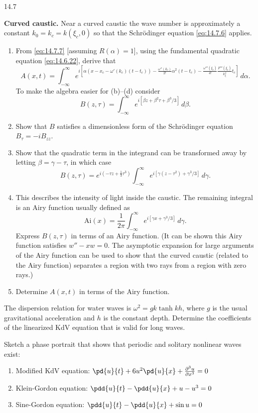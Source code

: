 \begin{exercises}{14.7}
\item \textbf{Curved caustic.}  Near a curved caustic the wave number is approximately a constant $k_0 = k_c = k(\xi_c, 0)$ so that the Schr\"odinger equation \eqref{eq:14.7.6} applies.
\begin{enumerate}
\item[(a)] From \eqref{eq:14.7.7} [assuming $R(\alpha) = 1$], using the fundamental quadratic equation \eqref{eq:14.6.22}, derive that
\[
A(x,t) = \int_{-\infty}^{\infty} e^{i[\alpha(x - x_c - \omega'(k_c)(t - t_c)) - \frac{\omega''(k_c)}{2!}\alpha^2(t - t_c) - \frac{\omega'''(\xi_c)}{4!}\frac{F'''(\xi_c)}{k_\xi^4}t_c]}\,d\alpha.
\]
To make the algebra easier for (b)--(d) consider
\[
B(z,\tau) = \int_{-\infty}^{\infty} e^{i[\beta z + \beta^2\tau + \beta^3/3]}\,d\beta.
\]
\item[(b)] Show that $B$ satisfies a dimensionless form of the Schr\"odinger equation $B_\tau = -iB_{zz}$.
\item[(c)] Show that the quadratic term in the integrand can be transformed away by letting $\beta = \gamma - \tau$, in which case
\[
B(z,\tau) = e^{i(-\tau z + \frac{1}{3}\tau^3)}\int_{-\infty}^{\infty} e^{i[\gamma(z - \tau^2) + \gamma^3/3]}\,d\gamma.
\]
\item[(d)] This describes the intensity of light inside the caustic.  The remaining integral is an Airy function usually defined as
\[
\text{Ai}(x) = \frac{1}{2\pi}\int_{-\infty}^{\infty} e^{i[\gamma x + \gamma^3/3]}\,d\gamma.
\]
Express $B(z,\tau)$ in terms of an Airy function.  (It can be shown this Airy function satisfies $w'' - xw = 0$.  The asymptotic expansion for large arguments of the Airy function can be used to show that the curved caustic (related to the Airy function) separates a region with two rays from a region with zero rays.)
\item[(e)] Determine $A(x,t)$ in terms of the Airy function.
\end{enumerate}

\item The dispersion relation for water waves is $\omega^2 = gk\tanh kh$, where $g$ is the usual gravitational acceleration and $h$ is the constant depth.  Determine the coefficients of the linearized KdV equation that is valid for long waves.

\item Sketch a phase portrait that shows that periodic and solitary nonlinear waves exist:
\begin{enumerate}
\item[(a)] Modified KdV equation: $\pd{u}{t} + 6u^2\pd{u}{x} + \frac{\partial^3 u}{\partial x^3} = 0$
\item[(b)] Klein-Gordon equation: $\pdd{u}{t} - \pdd{u}{x} + u - u^3 = 0$
\item[(c)] Sine-Gordon equation: $\pdd{u}{t} - \pdd{u}{x} + \sin u = 0$
\end{enumerate}


\end{exercises}
